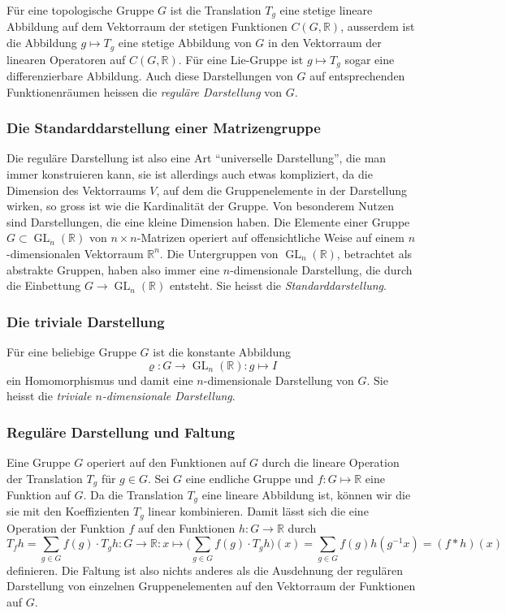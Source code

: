 Für eine topologische Gruppe $G$ ist die Translation $T_g$ eine 
stetige lineare Abbildung auf dem Vektorraum der stetigen Funktionen
$C(G,\mathbb{R})$, ausserdem ist die Abbildung $g\mapsto T_g$ eine
stetige Abbildung von $G$ in den Vektorraum der linearen Operatoren
auf $C(G,\mathbb{R})$.
Für eine Lie-Gruppe ist $g\mapsto T_g$ sogar eine differenzierbare
Abbildung.
Auch diese Darstellungen von $G$ auf entsprechenden Funktionenräumen
heissen die {\em reguläre Darstellung} von $G$.

%
%
\subsubsection{Die Standarddarstellung einer Matrizengruppe}
Die reguläre Darstellung ist also eine Art ``universelle Darstellung'',
die man immer konstruieren kann, sie ist allerdings auch etwas kompliziert,
da die Dimension des Vektorraums $V$, auf dem die Gruppenelemente in der
Darstellung wirken, so gross ist wie die Kardinalität der Gruppe.
Von besonderem Nutzen sind Darstellungen, die eine kleine Dimension haben.
Die Elemente einer Gruppe $G\subset\operatorname{GL}_n(\mathbb{R})$
von $n\times n$-Matrizen operiert auf offensichtliche Weise auf einem
$n$-dimensionalen Vektorraum $\mathbb{R}^n$.
Die Untergruppen von $\operatorname{GL}_n(\mathbb{R})$, betrachtet
als abstrakte Gruppen, haben also immer eine $n$-dimensionale Darstellung,
die durch die Einbettung $G\to \operatorname{GL}_n(\mathbb{R})$ entsteht.
Sie heisst die {\em Standarddarstellung}.

%
%
\subsubsection{Die triviale Darstellung}
Für eine beliebige Gruppe $G$ ist die konstante Abbildung
\[
\varrho
\colon
G\to \operatorname{GL}_n(\mathbb{R})
:
g\mapsto I
\]
ein Homomorphismus und damit eine $n$-dimensionale Darstellung von $G$.
Sie heisst die {\em triviale $n$-dimensionale Darstellung}.

%
%
\subsubsection{Reguläre Darstellung und Faltung}
Eine Gruppe $G$ operiert auf den Funktionen auf $G$ durch die 
lineare Operation der Translation $T_g$ für $g\in G$.
Sei $G$ eine endliche Gruppe und $f\colon G\mapsto \mathbb{R}$ eine
Funktion auf $G$.
Da die Translation $T_g$ eine lineare Abbildung ist, können wir die 
sie mit den Koeffizienten $T_g$ linear kombinieren.
Damit lässt sich die eine Operation der Funktion $f$ auf den Funktionen
$h\colon G\to\mathbb{R}$ durch
\begin{equation}
T_fh
=
\sum_{g\in G} f(g)\cdot T_gh
\colon
G\to\mathbb{R}
:
x\mapsto
\biggl( \sum_{g\in G} f(g)\cdot T_gh\biggr) (x)
=
\sum_{g\in G} f(g)h(g^{-1}x)
=
(f*h)(x)
\end{equation}
definieren.
Die Faltung ist also nichts anderes als die Ausdehnung der regulären
Darstellung von einzelnen Gruppenelementen auf den Vektorraum
der Funktionen auf $G$.

